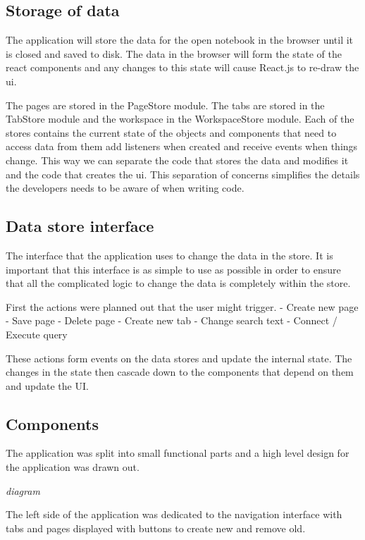 \subsection{Storage of data}\label{storage-of-data}

The application will store the data for the open notebook in the browser
until it is closed and saved to disk. The data in the browser will form
the state of the react components and any changes to this state will
cause React.js to re-draw the ui.

The pages are stored in the PageStore module. The tabs are stored in the
TabStore module and the workspace in the WorkspaceStore module. Each of
the stores contains the current state of the objects and components that
need to access data from them add listeners when created and receive
events when things change. This way we can separate the code that stores
the data and modifies it and the code that creates the ui. This
separation of concerns simplifies the details the developers needs to be
aware of when writing code.

\subsection{Data store interface}\label{data-store-interface}

The interface that the application uses to change the data in the store.
It is important that this interface is as simple to use as possible in
order to ensure that all the complicated logic to change the data is
completely within the store.

First the actions were planned out that the user might trigger. - Create
new page - Save page - Delete page - Create new tab - Change search text
- Connect / Execute query

These actions form events on the data stores and update the internal
state. The changes in the state then cascade down to the components that
depend on them and update the UI.

\subsection{Components}\label{components}

The application was split into small functional parts and a high level
design for the application was drawn out.

\emph{diagram}

The left side of the application was dedicated to the navigation
interface with tabs and pages displayed with buttons to create new and
remove old.

